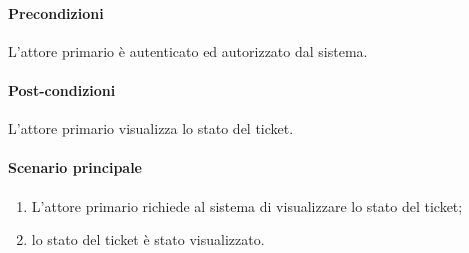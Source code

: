 \paragraph{Precondizioni} L'attore primario è autenticato ed autorizzato dal sistema.
\paragraph{Post-condizioni} L'attore primario visualizza lo stato del ticket.
\paragraph{Scenario principale}
\begin{enumerate}
    \item L'attore primario richiede al sistema di visualizzare lo stato del ticket;
    \item lo stato del ticket è stato visualizzato.
\end{enumerate}